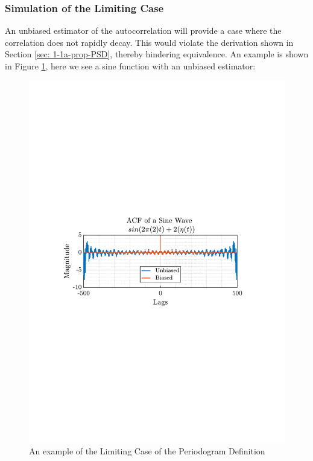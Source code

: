 \documentclass[12pt]{article}
\numberwithin{equation}{section}
\begin{document}
	\subsubsection{Simulation of the Limiting Case} \label{sec: 1-1b-prop-PSD}
	
	An unbiased estimator of the autocorrelation will provide a case where the correlation does not rapidly decay. This would violate the derivation shown in Section \ref{sec: 1-1a-prop-PSD}, thereby hindering equivalence.
	An example is shown in Figure \ref{fig: 1-1b}, here we see a sine function with an unbiased estimator:
	
	\begin{figure}[H]
		\centering
		\includegraphics[trim={2.2cm 11.2cm 3.15cm  11.2cm}, clip, width=\textwidth]{../MATLAB/figures/q1_1b_fig01.pdf} 
		\captionsetup{justification=centering}
		\caption{An example of the Limiting Case of the Periodogram Definition}
		\label{fig: 1-1b}
	\end{figure}
	
\end{document}
